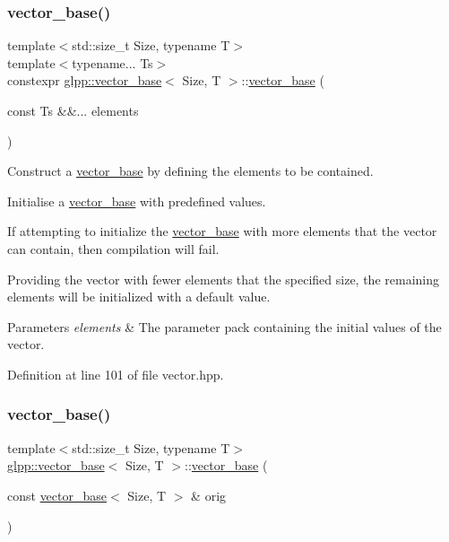 \subsubsection{\texorpdfstring{vector\+\_\+base()}{vector\_base()}\hspace{0.1cm}{\footnotesize\ttfamily [1/3]}}
{\footnotesize\ttfamily template$<$std\+::size\+\_\+t Size, typename T$>$ \\
template$<$typename... Ts$>$ \\
constexpr \hyperlink{classglpp_1_1vector__base}{glpp\+::vector\+\_\+base}$<$ Size, T $>$\+::\hyperlink{classglpp_1_1vector__base}{vector\+\_\+base} (\begin{DoxyParamCaption}\item[{const Ts \&\&...}]{elements }\end{DoxyParamCaption})\hspace{0.3cm}{\ttfamily [inline]}}



Construct a \hyperlink{classglpp_1_1vector__base}{vector\+\_\+base} by defining the elements to be contained. 

Initialise a \hyperlink{classglpp_1_1vector__base}{vector\+\_\+base} with predefined values.

If attempting to initialize the \hyperlink{classglpp_1_1vector__base}{vector\+\_\+base} with more elements that the vector can contain, then compilation will fail. 

Providing the vector with fewer elements that the specified size, the remaining elements will be initialized with a default value. 


\begin{DoxyParams}{Parameters}
{\em elements} & The parameter pack containing the initial values of the vector. \\
\hline
\end{DoxyParams}


Definition at line 101 of file vector.\+hpp.

\mbox{\label{classglpp_1_1vector__base_a9db979f6c03649746213794d289189bf}} 
\subsubsection{\texorpdfstring{vector\+\_\+base()}{vector\_base()}\hspace{0.1cm}{\footnotesize\ttfamily [2/3]}}
{\footnotesize\ttfamily template$<$std\+::size\+\_\+t Size, typename T$>$ \\
\hyperlink{classglpp_1_1vector__base}{glpp\+::vector\+\_\+base}$<$ Size, T $>$\+::\hyperlink{classglpp_1_1vector__base}{vector\+\_\+base} (\begin{DoxyParamCaption}\item[{const \hyperlink{classglpp_1_1vector__base}{vector\+\_\+base}$<$ Size, T $>$ \&}]{orig }\end{DoxyParamCaption})\hspace{0.3cm}{\ttfamily [inline]}}



